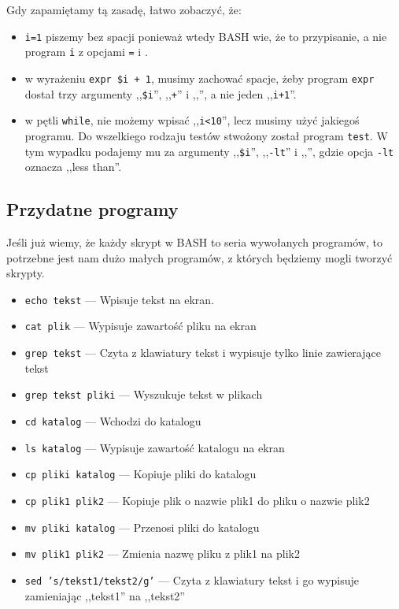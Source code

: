 \documentclass[polish]{instrukcja}
\begin{document}
Gdy zapamiętamy tą zasadę, łatwo zobaczyć, że:
\begin{itemize}
\item {\tt\red i=1} piszemy bez spacji ponieważ wtedy BASH wie, że to przypisanie, a nie program {\tt\red i} z opcjami {\tt\green =} i {\tt{}}. 
\item w wyrażeniu {\tt {\red expr} {\green \$i + 1}}, musimy zachować spacje, żeby program {\tt\red expr} dostał trzy argumenty ,,{\tt\green\$i}'', ,,{\tt\green +}'' i ,,{\tt{}}'', a nie jeden ,,{\tt\green i+1}''.
\item w pętli {\tt while}, nie możemy wpisać ,,{\tt i<10}'', lecz musimy użyć jakiegoś programu. Do wszelkiego rodzaju testów stwożony został program {\tt\red test}. W tym wypadku podajemy mu za argumenty ,,{\tt\green\$i}'', ,,{\tt\green -lt}'' i ,,{\tt{}}'', gdzie opcja {\tt\green -lt} oznacza ,,less than''.
\end{itemize}

\subsection{Przydatne programy}
Jeśli już wiemy, że każdy skrypt w BASH to seria wywołanych programów, to potrzebne jest nam dużo małych programów, z których będziemy mogli tworzyć skrypty.
\begin{itemize}
\item {\tt{\red echo} {\green tekst}} --- Wpisuje {\green tekst} na ekran.
\item {\tt{\red cat} {\green plik}} --- Wypisuje zawartość {\green plik}u na ekran
\item {\tt{\red grep} {\green tekst}} --- Czyta z klawiatury tekst i wypisuje tylko linie zawierające {\green tekst}
\item {\tt{\red grep} {\green tekst pliki}} --- Wyszukuje {\green tekst} w {\green plik}ach
\item {\tt{\red cd} {\green katalog}} --- Wchodzi do {\green katalogu}
\item {\tt{\red ls} {\green katalog}} --- Wypisuje zawartość {\green katalog}u na ekran
\item {\tt{\red cp} {\green pliki katalog}} --- Kopiuje {\green pliki} do {\green katalog}u
\item {\tt{\red cp} {\green plik1 plik2}} --- Kopiuje plik o nazwie {\green plik1} do pliku o nazwie {\green plik2}
\item {\tt{\red mv} {\green pliki katalog}} --- Przenosi {\green pliki} do {\green katalog}u
\item {\tt{\red mv} {\green plik1 plik2}} --- Zmienia nazwę pliku z {\green plik1} na {\green plik2}
\item {\tt{\red sed} {\green 's/tekst1/tekst2/g'}} --- Czyta z klawiatury tekst i go wypisuje zamieniając ,,{\green tekst1}'' na ,,{\green tekst2}''
\end{itemize}
\end{document}
